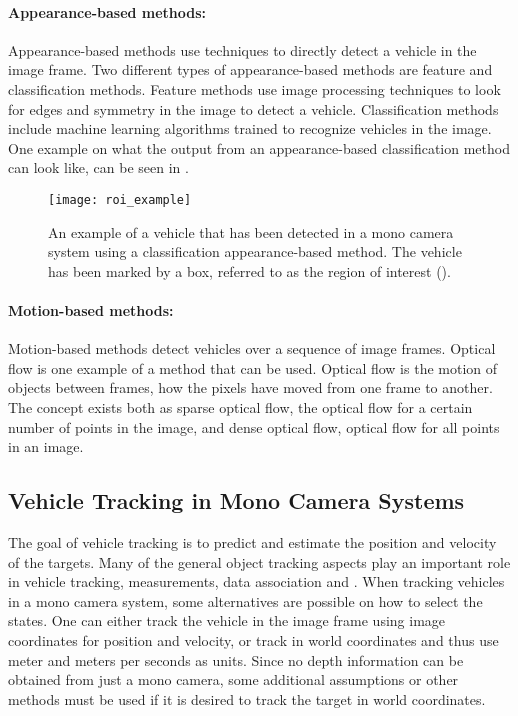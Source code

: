 \paragraph{Appearance-based methods:}
Appearance-based methods use techniques to directly detect a vehicle in the image frame.
Two different types of appearance-based methods are feature and classification methods.
Feature methods use image processing techniques to look for \eg edges and symmetry in the image to detect a vehicle.
Classification methods include machine learning algorithms trained to recognize vehicles in the image.
One example on what the output from an appearance-based classification method can look like, can be seen in .

\begin{figure}[!ht]
	\centering
	\texttt{[image: roi\_example]}
	\caption{\label{fig:roiexample} An example of a vehicle that has been detected in a mono camera system using a classification appearance-based method. The vehicle has been marked by a box, referred to as the region of interest (\abbrROI).}
\end{figure}

\paragraph{Motion-based methods:}
Motion-based methods detect vehicles over a sequence of image frames.
Optical flow is one example of a method that can be used.
Optical flow is the motion of objects between frames, \ie how the pixels have moved from one frame to another.
The concept exists both as sparse optical flow, \ie the optical flow for a certain number of points in the image, and dense optical flow, \ie optical flow for all points in an image.

\subsection{Vehicle Tracking in Mono Camera Systems}
The goal of vehicle tracking is to predict and estimate \eg the position and velocity of the targets.
Many of the general object tracking aspects play an important role in vehicle tracking, \eg measurements, data association and \abbrMTT.
When tracking vehicles in a mono camera system, some alternatives are possible on how to select the states.
One can either track the vehicle in the image frame using image coordinates for position and velocity, or track in  world coordinates and thus use meter and meters per seconds as units.
Since no depth information can be obtained from just a mono camera, some additional assumptions or other methods must be used if it is desired to track the target in  world coordinates.

